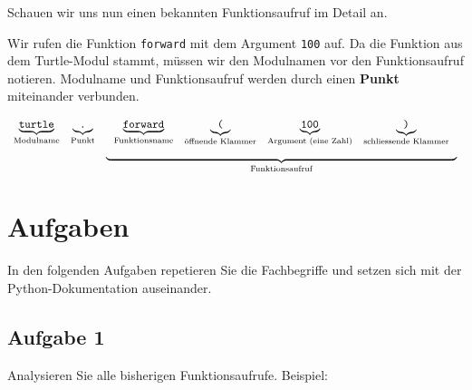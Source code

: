 Schauen wir uns nun einen bekannten Funktionsaufruf im Detail an.

\begin{example}
\label{example-function-call}

Wir rufen die Funktion \lstinline{forward} mit dem Argument \lstinline{100} auf. Da die Funktion aus dem Turtle-Modul stammt, müssen wir den Modulnamen vor den Funktionsaufruf notieren. Modulname und Funktionsaufruf werden durch einen \textbf{Punkt} miteinander verbunden.

$$
\begin{array}[t]{ccc} 
\underbrace{\textrm{\texttt{turtle}}}_{\textrm{Modulname}} & \underbrace{\textrm{\texttt{.}}}_{\textrm{Punkt}} & 
\begin{array}[t]{cccc} 
\underbrace{\textrm{\texttt{forward}}}_{\textrm{Funktionsname}} & \underbrace{\textrm{\texttt{(}}}_{\textrm{öffnende Klammer}} &\underbrace{\textrm{\texttt{100}}}_{\textrm{Argument (eine Zahl)}} & \underbrace{\textrm{\texttt{)}}}_{\textrm{schliessende Klammer}} \end{array} \\
 &  & \underbrace{\hspace{11cm}}_{\textrm{Funktionsaufruf}}
\end{array}
$$

\end{example}

\section{Aufgaben}

In den folgenden Aufgaben repetieren Sie die Fachbegriffe und setzen sich mit der Python-Dokumentation auseinander.

\subsection{Aufgabe 1}

Analysieren Sie alle bisherigen Funktionsaufrufe. Beispiel:

